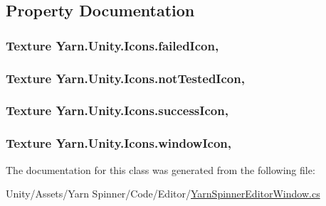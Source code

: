 \subsection{Property Documentation}
\hypertarget{a00087_aae7cc0e5016db04a90b2aa0e80957626}{
\subsubsection[{failed\-Icon}]{\setlength{\rightskip}{0pt plus 5cm}Texture Yarn.\-Unity.\-Icons.\-failed\-Icon\hspace{0.3cm}{\ttfamily [static]}, {\ttfamily [get]}}}\label{a00087_aae7cc0e5016db04a90b2aa0e80957626}
\hypertarget{a00087_ab8afce565cd2ad1543d1e32e7e589e77}{
\subsubsection[{not\-Tested\-Icon}]{\setlength{\rightskip}{0pt plus 5cm}Texture Yarn.\-Unity.\-Icons.\-not\-Tested\-Icon\hspace{0.3cm}{\ttfamily [static]}, {\ttfamily [get]}}}\label{a00087_ab8afce565cd2ad1543d1e32e7e589e77}
\hypertarget{a00087_aec8aea03eb6e31771ebc98e0611fff79}{
\subsubsection[{success\-Icon}]{\setlength{\rightskip}{0pt plus 5cm}Texture Yarn.\-Unity.\-Icons.\-success\-Icon\hspace{0.3cm}{\ttfamily [static]}, {\ttfamily [get]}}}\label{a00087_aec8aea03eb6e31771ebc98e0611fff79}
\hypertarget{a00087_aa78ab016ad041bc36850c8b20ba63972}{
\subsubsection[{window\-Icon}]{\setlength{\rightskip}{0pt plus 5cm}Texture Yarn.\-Unity.\-Icons.\-window\-Icon\hspace{0.3cm}{\ttfamily [static]}, {\ttfamily [get]}}}\label{a00087_aa78ab016ad041bc36850c8b20ba63972}


The documentation for this class was generated from the following file\-:\begin{DoxyCompactItemize}
\item 
Unity/\-Assets/\-Yarn Spinner/\-Code/\-Editor/\hyperlink{a00254}{Yarn\-Spinner\-Editor\-Window.\-cs}\end{DoxyCompactItemize}

